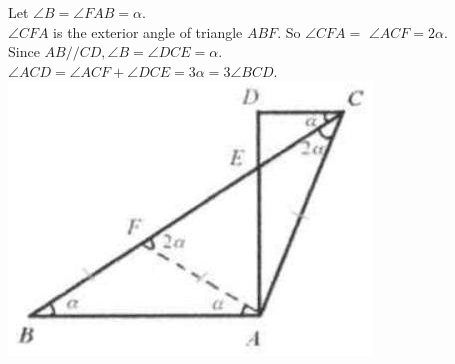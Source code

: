 \documentclass{article}
\begin{document}
Let \(\angle B=\angle F A B=\alpha\).\\
\(\angle C F A\) is the exterior angle of triangle \(A B F\). So \(\angle C F A=\) \(\angle A C F=2 \alpha\).\\
Since \(A B / / C D, \angle B=\angle D C E=\alpha\).\\
\(\angle A C D=\angle A C F+\angle D C E=3 \alpha=3 \angle B C D\).\\
\centering
\includegraphics[width=\textwidth]{images/020(2).jpg}
\end{document}
